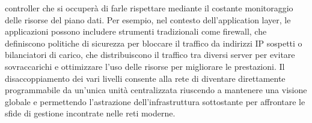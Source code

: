 controller che si occuperà di farle rispettare mediante il costante monitoraggio delle risorse del piano dati. 
Per esempio, nel contesto dell'application layer, le applicazioni possono includere strumenti tradizionali come firewall, che definiscono politiche di sicurezza per bloccare il traffico da indirizzi IP sospetti \cite{appl} o
bilanciatori di carico, che distribuiscono il traffico tra diversi server per evitare sovraccarichi
e ottimizzare l'uso delle risorse per migliorare le prestazioni. 
\newline Il disaccoppiamento dei vari livelli consente alla rete di diventare direttamente programmabile da un'unica unità
centralizzata riuscendo a mantenere una visione globale e permettendo l'astrazione dell'infrastruttura sottostante per affrontare le sfide 
di gestione incontrate nelle reti moderne.

